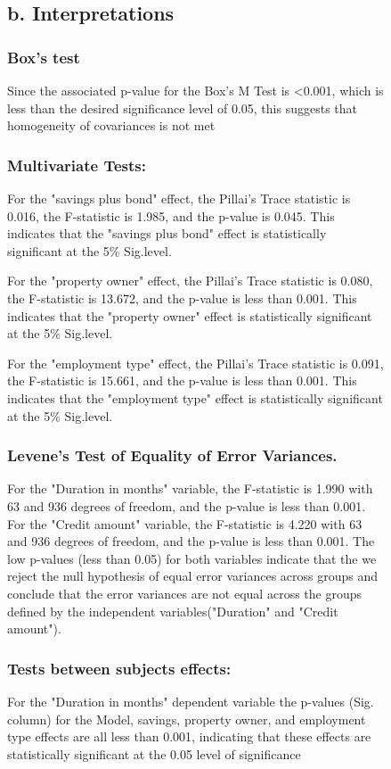 \documentclass[english,10pt,a4paper]{article}
\begin{document}
\begin{figure}[h]
	\subsection*{b. Interpretations}
	\subsubsection*{Box's test}	
	Since the associated p-value for the Box’s M Test is <0.001, which is less than the desired significance level of 0.05, this suggests that homogeneity of covariances is not met
	
	\subsubsection*{Multivariate Tests:}
For the "savings plus bond" effect, the Pillai's Trace statistic is 0.016, the F-statistic is 1.985, and the p-value is 0.045. This indicates that the "savings plus bond" effect is statistically significant at the 5\% Sig.level.

For the "property owner" effect, the Pillai's Trace statistic is 0.080, the F-statistic is 13.672, and the p-value is less than 0.001. This indicates that the "property owner" effect is statistically significant at the 5\% Sig.level.

For the "employment type" effect, the Pillai's Trace statistic is 0.091, the F-statistic is 15.661, and the p-value is less than 0.001. This indicates that the "employment type" effect is statistically significant at the 5\% Sig.level.

	\subsubsection*{Levene's Test of Equality of Error Variances.}
	For the "Duration in months" variable, the F-statistic is 1.990 with 63 and 936 degrees of freedom, and the p-value is less than 0.001.
	For the "Credit amount" variable, the F-statistic is 4.220 with 63 and 936 degrees of freedom, and the p-value is less than 0.001.
	The low p-values (less than 0.05) for both variables indicate that the we reject the null hypothesis of equal error variances across groups and conclude that the error variances are not equal across the groups defined by the independent variables("Duration"
	and "Credit amount").
	
		\subsubsection*{Tests between subjects effects:}
For the "Duration in months" dependent variable the p-values (Sig. column) for the Model, savings, property owner, and employment type effects are all less than 0.001, indicating that these effects are statistically significant at the 0.05 level of significance


\end{figure}
\end{document}
